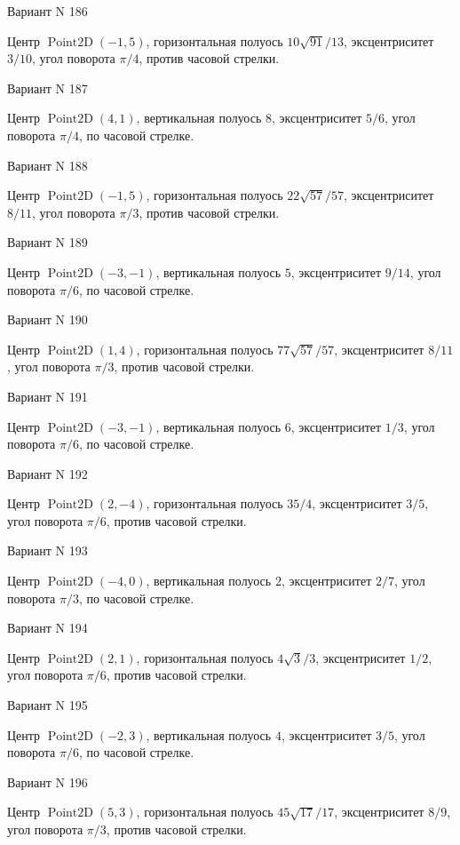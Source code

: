 \documentclass[11pt]{report}
\begin{document}
Вариант N 186

Центр $\operatorname{Point2D}\left(-1, 5\right)$, горизонтальная полуось $10 \sqrt{91} / 13$, эксцентриситет $3 / 10$, угол поворота $\pi / 4$, против часовой стрелки.

Вариант N 187

Центр $\operatorname{Point2D}\left(4, 1\right)$, вертикальная полуось $8$, эксцентриситет $5 / 6$, угол поворота $\pi / 4$, по часовой стрелке.

Вариант N 188

Центр $\operatorname{Point2D}\left(-1, 5\right)$, горизонтальная полуось $22 \sqrt{57} / 57$, эксцентриситет $8 / 11$, угол поворота $\pi / 3$, против часовой стрелки.

Вариант N 189

Центр $\operatorname{Point2D}\left(-3, -1\right)$, вертикальная полуось $5$, эксцентриситет $9 / 14$, угол поворота $\pi / 6$, по часовой стрелке.

Вариант N 190

Центр $\operatorname{Point2D}\left(1, 4\right)$, горизонтальная полуось $77 \sqrt{57} / 57$, эксцентриситет $8 / 11$, угол поворота $\pi / 3$, против часовой стрелки.

Вариант N 191

Центр $\operatorname{Point2D}\left(-3, -1\right)$, вертикальная полуось $6$, эксцентриситет $1 / 3$, угол поворота $\pi / 6$, по часовой стрелке.

Вариант N 192

Центр $\operatorname{Point2D}\left(2, -4\right)$, горизонтальная полуось $35 / 4$, эксцентриситет $3 / 5$, угол поворота $\pi / 6$, против часовой стрелки.

Вариант N 193

Центр $\operatorname{Point2D}\left(-4, 0\right)$, вертикальная полуось $2$, эксцентриситет $2 / 7$, угол поворота $\pi / 3$, по часовой стрелке.

Вариант N 194

Центр $\operatorname{Point2D}\left(2, 1\right)$, горизонтальная полуось $4 \sqrt{3} / 3$, эксцентриситет $1 / 2$, угол поворота $\pi / 6$, против часовой стрелки.

Вариант N 195

Центр $\operatorname{Point2D}\left(-2, 3\right)$, вертикальная полуось $4$, эксцентриситет $3 / 5$, угол поворота $\pi / 6$, по часовой стрелке.

Вариант N 196

Центр $\operatorname{Point2D}\left(5, 3\right)$, горизонтальная полуось $45 \sqrt{17} / 17$, эксцентриситет $8 / 9$, угол поворота $\pi / 3$, против часовой стрелки.
\end{document}
